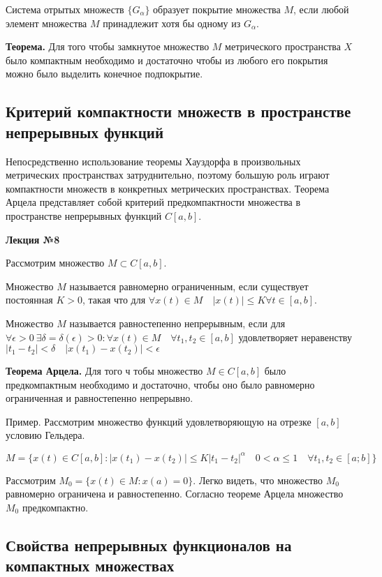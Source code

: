 \documentclass[14pt,a4paper]{extarticle}
\theoremstyle{definition}
\theoremstyle{remark}
\renewcommand{\[}{\begin{dmath*}[compact]}
\renewcommand{\]}{\end{dmath*}}
\newcommand{\tth}[1][]{\textbf{Теорема#1.}}
\begin{document}
Система отрытых множеств $\{G_\alpha\}$ образует покрытие множества $M$, если любой элемент множества $M$ принадлежит хотя бы одному из $G_\alpha$.

\tth[] Для того чтобы замкнутое множество $M$ метрического пространства $X$ было компактным необходимо и достаточно чтобы из любого его покрытия можно было выделить конечное подпокрытие.

\subsection{Критерий компактности множеств в пространстве непрерывных функций}

Непосредственно использование теоремы Хауздорфа в произвольных метрических пространствах затруднительно, поэтому большую роль играют компактности множеств в конкретных метрических пространствах. Теорема Арцела представляет собой критерий предкомпактности множества в пространстве непрерывных функций $C[a,b]$.

\textbf{Лекция №8}

Рассмотрим множество $M\subset C[a,b]$.

Множество $M$ называется равномерно ограниченным, если существует постоянная $K>0$, такая что для $\forall x(t)\in M \quad |x(t)|\leq K \forall t \in [a,b]$.

Множество $M$ называется равностепенно непрерывным, если для $\forall \epsilon > 0 \ \exists \delta = \delta(\epsilon)>0:\forall x(t)\in M\quad \forall t_1,t_2\in [a,b]$ удовлетворяет неравенству $|t_1-t_2|<\delta \quad |x(t_1)-x(t_2)|<\epsilon$

\tth[ Арцела] Для того ч тобы множество $M\in C[a,b]$ было предкомпактным необходимо и достаточно, чтобы оно было равномерно ограниченная и равностепенно непрерывно.

Пример. Рассмотрим множество функций удовлетворяющую на отрезке $[a,b]$ условию Гельдера.

\[
M=\{x(t)\in C[a,b]: |x(t_1)-x(t_2)|\leq K|t_1-t_2|^\alpha \quad 0 < \alpha \leq 1 \quad \forall t_1,t_2 \in [a;b]\}
\]

Рассмотрим $M_0=\{x(t)\in M:x(a)=0\}$. Легко видеть, что множество $M_0$ равномерно ограничена и равностепенно. Согласно теореме Арцела множество $M_0$ предкомпактно.

\subsection{Свойства непрерывных функционалов на компактных множествах}
\end{document}
